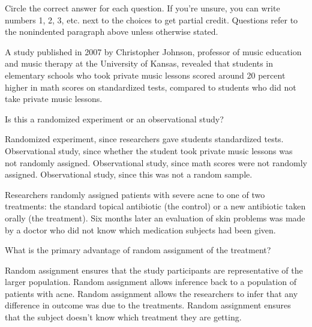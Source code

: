 \documentclass{article}
\begin{document}
	Circle the correct answer for each question.  If you're unsure, you can write numbers 1, 2, 3, etc. next to the choices to get partial credit.  Questions refer to the nonindented paragraph above unless otherwise stated.\\[.5cm]
	
	\begin{mcquestions}
		\begin{mcquestioninstruction}
			A study published in 2007 by Christopher Johnson, professor of music education and music therapy at the University of Kansas, revealed that students in elementary schools who took private music lessons scored around 20 percent higher in math scores on standardized tests, compared to  students who did not take private music lessons.
		\end{mcquestioninstruction}
		\question Is this a randomized experiment or an observational study?
		\begin{mcanswerslist}
			\answer Randomized experiment, since researchers gave students standardized tests.
			\answer[correct] Observational study, since whether the student took private music lessons was not randomly assigned.
			\answer Observational study, since math scores were not randomly assigned.
			\answer Observational study, since this was not a random sample.
		\end{mcanswerslist}
		
		\begin{mcquestioninstruction}
			Researchers randomly assigned patients with severe acne to one of two treatments: the standard topical antibiotic (the control) or a new antibiotic taken orally (the treatment). Six months later an evaluation of skin problems was made by a doctor who did not know which medication subjects had been given.
		\end{mcquestioninstruction}
		
		\question What is the primary advantage of random assignment of the treatment?
		\begin{mcanswerslist}
			\answer Random assignment ensures that the study participants are representative of the larger population.
			\answer Random assignment allows inference back to a population of patients with acne.
			\answer[correct] Random assignment allows the researchers to infer that any difference in outcome was due to the treatments.
			\answer Random assignment ensures that the subject doesn't know which treatment they are getting.
		\end{mcanswerslist}
		

\end{mcquestions}
\end{document}
